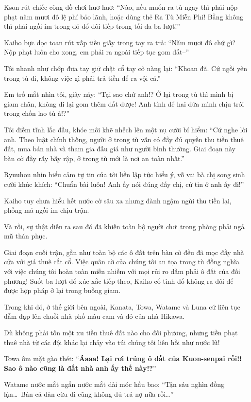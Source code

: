 \documentclass[../main.tex]{subfiles}
\begin{document}
Kson rút chiếc còng đồ chơi huơ huơ: ``Nào, nếu muốn ra tù ngay thì phải nộp phạt năm mươi đô lệ phí bảo lãnh, hoặc dùng thẻ Ra Tù Miễn Phí! Bằng không thì phải ngồi im trong đó đổ đôi tiếp trong tối đa ba lượt!''

Kaiho bực dọc toan rút xấp tiền giấy trong tay ra trả: ``Năm mươi đô chứ gì? Nộp phạt luôn cho xong, em phải ra ngoài tiếp tục gom đất--''

Tôi nhanh như chớp đưa tay giữ chặt cổ tay cô nàng lại: ``Khoan đã. Cứ ngồi yên trong tù đi, không việc gì phải trả tiền để ra vội cả.''

Em trố mắt nhìn tôi, giãy nảy: ``Tại sao chứ anh!? Ở lại trong tù thì mình bị giam chân, không đi lại gom thêm đất được! Anh tính để hai đứa mình chịu trói trong chốn lao tù à!?''

Tôi điềm tĩnh lắc đầu, khóe môi khẽ nhếch lên một nụ cười bí hiểm: ``Cứ nghe lời anh. Theo luật chính thống, người ở trong tù vẫn có đầy đủ quyền thu tiền thuê đất, mua bán nhà và tham gia đấu giá như người bình thường. Giai đoạn này bàn cờ đầy rẫy bẫy rập, ở trong tù mới là nơi an toàn nhất.''

Ryuuhou nhìn biểu cảm tự tin của tôi liền lập tức hiểu ý, vỗ vai bà chị song sinh cười khúc khích: ``Chuẩn bài luôn! Anh ấy nói đúng đấy chị, cứ tin ở anh ấy đi!''

Kaiho tuy chưa hiểu hết nước cờ sâu xa nhưng đành ngậm ngùi thu tiền lại, phồng má ngồi im chịu trận.

Và rồi, sự thật diễn ra sau đó đã khiến toàn bộ người chơi trong phòng phải ngả mũ thán phục.

Giai đoạn cuối trận, gần như toàn bộ các ô đất trên bàn cờ đều đã mọc đầy nhà cửa với giá thuê cắt cổ. Việc quân cờ của chúng tôi an tọa trong tù đồng nghĩa với việc chúng tôi hoàn toàn miễn nhiễm với mọi rủi ro dẫm phải ô đất của đối phương! Suốt ba lượt đổ xúc xắc tiếp theo, Kaiho cố tình đổ không ra đôi để được hợp pháp ở lại trong buồng giam.

Trong khi đó, ở thế giới bên ngoài, Kanata, Towa, Watame và Luna cứ liên tục dẫm đạp lên chuỗi nhà phố màu cam và đỏ của nhà Hikawa.

Dù không phải tốn một xu tiền thuê đất nào cho đối phương, nhưng tiền phạt thuê nhà từ các đội khác lại chảy vào túi chúng tôi liên hồi như nước lũ!

Towa ôm mặt gào thét: ``\textbf{Áaaa! Lại rơi trúng ô đất của Kuon-senpai rồi!! Sao ô nào cũng là đất nhà anh ấy thế này!?}''

Watame nước mắt ngắn nước mắt dài móc hầu bao: ``Tận sáu nghìn đồng lận\dots\ Bán cả đàn cừu đi cũng không đủ trả nợ nữa rồi\dots''
\end{document}
